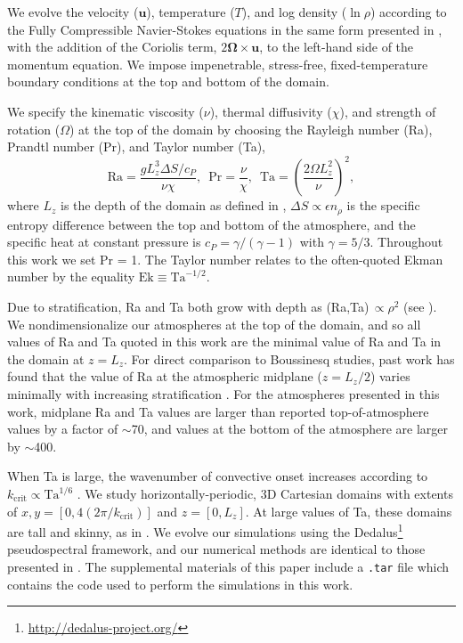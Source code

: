 \documentclass[twocolumn, amsmath, amsfonts, amssymb, trackchanges]{aastex62}
\begin{document}
We evolve the velocity ($\bm{u}$), temperature ($T$), 
and log density ($\ln\rho$) according to the Fully Compressible Navier-Stokes equations
in the same form presented in \AB, with the
addition of the Coriolis term, \mbox{$2\bm{\Omega}\times\bm{u}$}, to the left-hand side
of the momentum equation. 
We impose impenetrable, stress-free, fixed-temperature boundary conditions at the top and bottom of the domain.


We specify the kinematic viscosity ($\nu$), thermal diffusivity ($\chi$), and strength of
rotation ($\Omega$) at the top of the domain by choosing the Rayleigh number 
(Ra), Prandtl number (Pr), and Taylor number (Ta),
\begin{equation}
    \text{Ra} = \frac{g L_z^3 \Delta S / c_P}{\nu \chi}, \,\,\,
    \text{Pr} = \frac{\nu}{\chi}, \,\,\,
    \text{Ta} = \left(\frac{2 \Omega L_z^2}{\nu}\right)^2,
	\label{eqn:input_parameters}
\end{equation}
where $L_z$ is the depth of the domain as defined in \AB, 
$\Delta S \propto \epsilon n_\rho$ is the specific entropy difference between
the top and bottom of the atmosphere, and the specific heat at constant pressure is $c_P = \gamma/(\gamma-1)$
with $\gamma = 5/3$.
Throughout this work we set Pr = 1. The Taylor number relates to the often-quoted
Ekman number by the equality $\text{Ek} \equiv \text{Ta}^{-1/2}$.

Due to stratification, Ra and Ta both grow with depth as (Ra,Ta)$\, \propto \rho^2$ (see \AB).
We nondimensionalize our atmospheres at the top of the domain, and so all values of Ra and
Ta quoted in this work are the minimal value of Ra and Ta in the domain at $z = L_z$.
For direct comparison to Boussinesq studies, past work has found that the value of Ra 
at the atmospheric midplane ($z = L_z/2$) varies minimally with increasing stratification 
\citep{unnoetall1960}. For the atmospheres presented in this work, 
midplane Ra and Ta values
are larger than reported top-of-atmosphere values by a factor of $\sim$70, and values at the
bottom of the atmosphere are larger by $\sim$400.

When Ta is large, the wavenumber of convective onset increases according to $k_{\text{crit}} \propto \text{Ta}^{1/6}$
\citep{Chandrasekhar,calkins&all2015a}.
We study horizontally-periodic, 3D Cartesian domains with extents of
$x, y = [0, 4(2\pi/k_{\text{crit}})]$ and $z = [0, L_z]$. At large values of Ta, these
domains are tall and skinny, as in \cite{stellmach&all2014}.
We evolve our simulations using the Dedalus\footnote{\url{http://dedalus-project.org/}} 
pseudospectral framework, and our numerical methods are identical to those presented
in \AB. The supplemental materials of this paper include a \texttt{.tar} file which
contains the code used to perform the simulations in this work.
\end{document}

